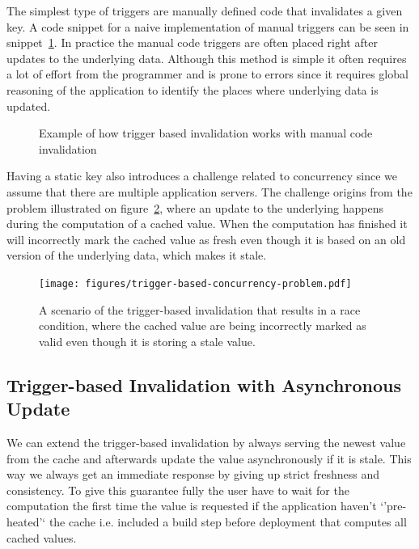 The simplest type of triggers are manually defined code that invalidates a given key. A code snippet for a naive implementation of manual triggers can be seen in snippet~\ref{code:manual-trigger-invalidation}. In practice the manual code triggers are often placed right after updates to the underlying data. Although this method is simple it often requires a lot of effort from the programmer and is prone to errors since it requires global reasoning of the application to identify the places where underlying data is updated.

\begin{figure}

\caption{Example of how trigger based invalidation works with manual code invalidation}
\label{code:manual-trigger-invalidation}
\end{figure}


Having a static key also introduces a challenge related to concurrency since we assume that there are multiple application servers. The challenge origins from the problem illustrated on figure~\ref{fig:trigger-based-concurrency-problem}, where an update to the underlying happens during the computation of a cached value. When the computation has finished it will incorrectly mark the cached value as fresh even though it is based on an old version of the underlying data, which makes it stale.

\begin{figure}[ht!]
  \centering
  \texttt{[image: figures/trigger-based-concurrency-problem.pdf]}
  \caption{A scenario of the trigger-based invalidation that results in a race condition, where the cached value are being incorrectly marked as valid even though it is storing a stale value.}
  \label{fig:trigger-based-concurrency-problem}
\end{figure}


\subsection{Trigger-based Invalidation with Asynchronous Update}
\label{subsec:trigger-based-invalidation-with-asynchronous-update}

We can extend the trigger-based invalidation by always serving the newest value from the cache and afterwards update the value asynchronously if it is stale. This way we always get an immediate response by giving up strict freshness and consistency. To give this guarantee fully the user have to wait for the computation the first time the value is requested if the application haven't `'pre-heated'` the cache i.e. included a build step before deployment that computes all cached values.

